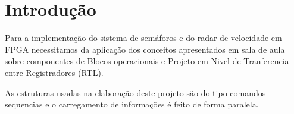 \section{Introdução}
\setlength{\parindent}{2cm}

Para a implementação do sistema de semáforos e do radar de velocidade em FPGA necessitamos da aplicação dos conceitos apresentados em sala de aula sobre componentes de Blocos operacionais e Projeto em Nivel de Tranferencia entre Registradores (RTL).

As estruturas usadas na elaboração deste projeto são do tipo comandos sequencias e o carregamento de informações é feito de forma paralela.
